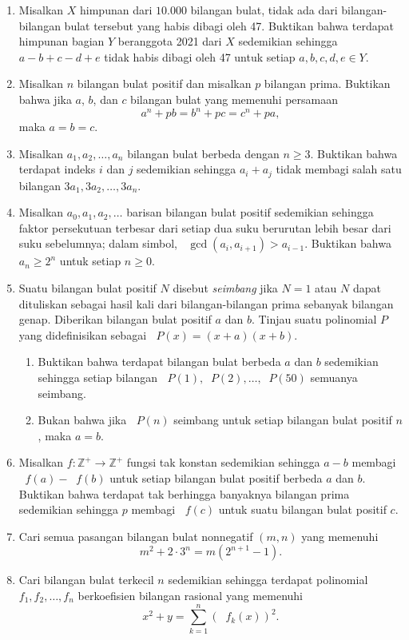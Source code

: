 \documentclass[12pt]{article}
\newcommand*\func[2]{\mathop{}\!{#1}{\left({#2}\right)}}
\begin{document}
\begin{enumerate}[leftmargin=*]
		\item Misalkan $ X $ himpunan dari $ 10.000 $ bilangan bulat, tidak ada dari bilangan-bilangan bulat tersebut yang habis dibagi oleh 47. Buktikan bahwa terdapat himpunan bagian $ Y $ beranggota 2021 dari $ X $ sedemikian sehingga $ a - b + c - d + e $ tidak habis dibagi oleh 47 untuk setiap $ a, b, c, d, e \in Y $.
		\item Misalkan $ n $ bilangan bulat positif dan misalkan $ p $ bilangan prima. Buktikan bahwa jika $ a $, $ b $, dan $ c $ bilangan bulat yang memenuhi persamaan
		\[ a^{n} + pb = b^{n} + pc = c^{n} + pa, \]
		maka $ a = b = c $.
		\item Misalkan $ a_{1}, a_{2}, \dots, a_{n} $ bilangan bulat berbeda dengan $ n \geq 3 $. Buktikan bahwa terdapat indeks $ i $ dan $ j $ sedemikian sehingga $ a_{i} + a_{j} $ tidak membagi salah satu bilangan $ 3a_{1}, 3a_{2}, \dots, 3a_{n} $.
		\item Misalkan $ a_{0}, a_{1}, a_{2}, \dots $ barisan bilangan bulat positif sedemikian sehingga faktor persekutuan terbesar dari setiap dua suku berurutan lebih besar dari suku sebelumnya; dalam simbol, $ \func{\gcd}{a_{i}, a_{i + 1}} > a_{i - 1} $. Buktikan bahwa $ a_{n} \geq 2^{n} $ untuk setiap $ n \geq 0 $.
		\item Suatu bilangan bulat positif $ N $ disebut \textit{seimbang} jika $ N = 1 $ atau $ N $ dapat dituliskan sebagai hasil kali dari bilangan-bilangan prima sebanyak bilangan genap. Diberikan bilangan bulat positif $ a $ dan $ b $. Tinjau suatu polinomial $ P $ yang didefinisikan sebagai $ \func{P}{x} = \left(x + a\right)\left(x + b\right) $.
		\begin{enumerate}
			\item Buktikan bahwa terdapat bilangan bulat berbeda $ a $ dan $ b $ sedemikian sehingga setiap bilangan $ \func{P}{1}, \func{P}{2}, \dots, \func{P}{50} $ semuanya seimbang.
			\item Bukan bahwa jika $ \func{P}{n} $ seimbang untuk setiap bilangan bulat positif $ n $, maka $ a = b $.
		\end{enumerate}
		\item Misalkan $ f : \mathbb{Z}^{+} \to \mathbb{Z}^{+} $ fungsi tak konstan sedemikian sehingga $ a - b $ membagi $ \func{f}{a} - \func{f}{b} $ untuk setiap bilangan bulat positif berbeda $ a $ dan $ b $. Buktikan bahwa terdapat tak berhingga banyaknya bilangan prima sedemikian sehingga $ p $ membagi $ \func{f}{c} $ untuk suatu bilangan bulat positif $ c $.
		\item Cari semua pasangan bilangan bulat nonnegatif $ \left(m, n\right) $ yang memenuhi
		\[ m^{2} + 2 \cdot 3^{n} = m\left(2^{n + 1} - 1\right). \]
		\item Cari bilangan bulat terkecil $ n $ sedemikian sehingga terdapat polinomial $ f_{1}, f_{2}, \dots, f_{n} $ berkoefisien bilangan rasional yang memenuhi
		\[ x^{2} + y = \sum_{k = 1}^{n}{\left(\func{f_{k}}{x}\right)^{2}}. \]
		

\end{enumerate}
\end{document}
